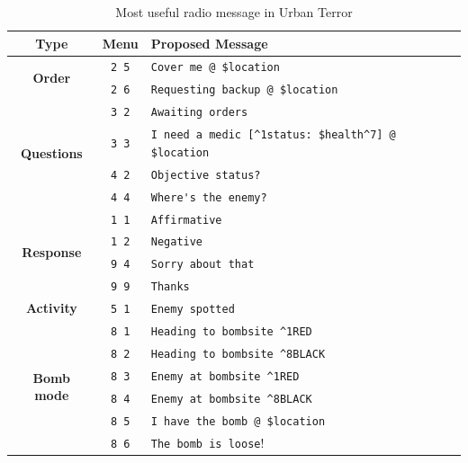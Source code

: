 \newcommand{\radio}[1]{\texttt{#1}}

\begin{table}[ht]
  \centering\small
  \begin{tabular}[h]{|c||c|l|}
    \hline
    \textbf{Type} & 
    \textbf{Menu} & \textbf{Proposed Message} \\ 
    \hline\hline
    \multirow{2}{*}{\textbf{Order}} 
                      & \radio{2 5} & \verb!Cover me @ $location! \\ 
                      & \radio{2 6} & \verb!Requesting backup @ $location!\\\hline
    \multirow{4}{*}{\textbf{Questions}}  
                       & \radio{3 2}  & \verb!Awaiting orders! \\ 
                       & \radio{3 3}  & \verb!I need a medic [^1status: $health^7] @ $location!\\
                       & \radio{4 2}  & \verb!Objective status?! \\
                       & \radio{4 4}  & \verb!Where's the enemy?! \\\hline
     \multirow{4}{*}{\textbf{Response}} 
                       & \radio{1 1} & \verb!Affirmative! \\ 
                       & \radio{1 2} & \verb!Negative! \\
                       & \radio{9 4} & \verb!Sorry about that! \\
                       & \radio{9 9} & \verb!Thanks! \\\hline
    \textbf{Activity}     & \radio{5 1} & \verb!Enemy spotted!\\\hline
    \multirow{6}{*}{\textbf{Bomb mode}}
                       & \radio{8 1} & \verb!Heading to bombsite ^1RED!\\
                       & \radio{8 2} & \verb!Heading to bombsite ^8BLACK!\\
                       & \radio{8 3} & \verb!Enemy at bombsite ^1RED!\\
                       & \radio{8 4} & \verb!Enemy at bombsite ^8BLACK!\\
                       & \radio{8 5} & \verb!I have the bomb @ $location!\\
                       & \radio{8 6} & \verb!The bomb is loose!!\\\hline
 
  \end{tabular}
  \caption{Most useful radio message in Urban Terror}
  \label{tab:radio}
\end{table}


